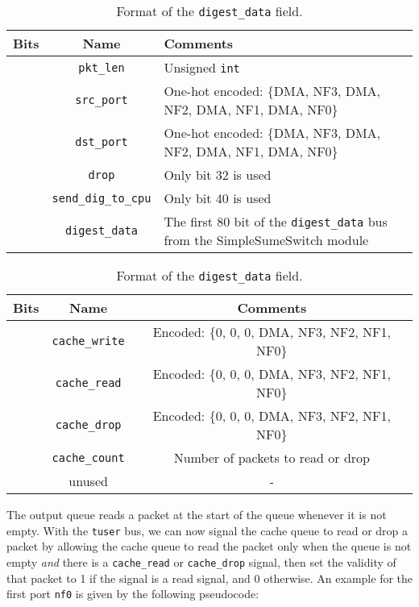 \begin{table}[!h]
	\centering
	\caption{Format of the \texttt{tuser} signal.}
	\label{tab:tuser}
	\begin{tabular}{ | c | c | >{\centering\arraybackslash}m{9.5cm} |}
		\hline
		\textbf{Bits} & \textbf{Name} & \textbf{Comments} \\ \hline
		[15:0] & \verb|pkt_len| & Unsigned \verb|int| \\ \hline
		[23:16] & \verb|src_port| & One-hot encoded: \{DMA, NF3, DMA, NF2, DMA, NF1, DMA, NF0\} \\ \hline
		[31:24] & \verb|dst_port| & One-hot encoded: \{DMA, NF3, DMA, NF2, DMA, NF1, DMA, NF0\} \\ \hline
		[39:32] & \verb|drop| & Only bit 32 is used \\ \hline
		[47:40] & \verb|send_dig_to_cpu| & Only bit 40 is used \\ \hline
		[127:48] & \verb|digest_data| & The first 80 bit of the \verb|digest_data| bus from the SimpleSumeSwitch module \\ \hline
	\end{tabular}
	
	\vspace{1em}
	
	\centering
	\caption{Format of the \texttt{digest\_data} field.}
	\label{tab:digest-data}
	\begin{tabular}{ | c | c | c |}
		\hline
		\textbf{Bits} & \textbf{Name} & \textbf{Comments} \\ \hline
		[55:48] & \verb|cache_write| & Encoded: \{0, 0, 0, DMA, NF3, NF2, NF1, NF0\} \\ \hline
		[63:56] & \verb|cache_read| & Encoded: \{0, 0, 0, DMA, NF3, NF2, NF1, NF0\} \\ \hline
		[71:64] & \verb|cache_drop| & Encoded: \{0, 0, 0, DMA, NF3, NF2, NF1, NF0\} \\ \hline
		[79:72] & \verb|cache_count| & Number of packets to read or drop \\ \hline
		[127:80] & unused & - \\ \hline
	\end{tabular}
\end{table}

The output queue reads a packet at the start of the queue whenever it is not empty. With the \texttt{tuser} bus, we can now signal the cache queue to read or drop a packet by allowing the cache queue to read the packet only when the queue is not empty \textit{and} there is a \verb|cache_read| or \verb|cache_drop| signal, then set the validity of that packet to 1 if the signal is a read signal, and 0 otherwise. An example for the first port \verb|nf0| is given by the following pseudocode:

